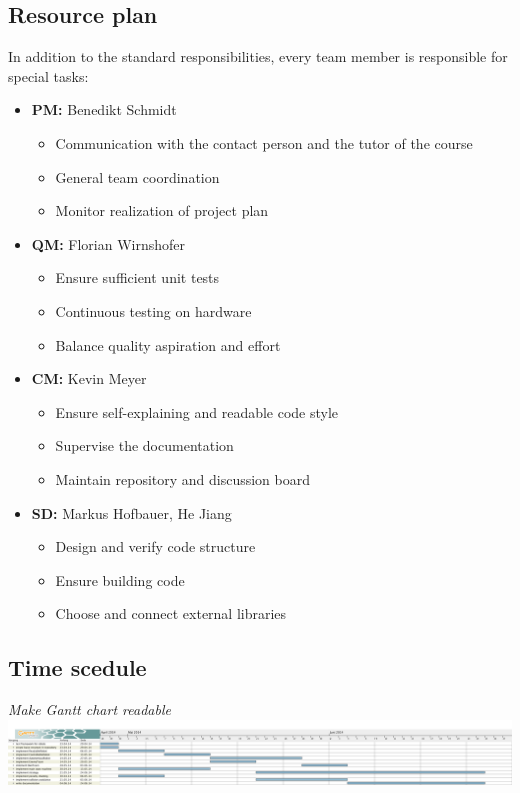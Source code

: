 \documentclass[12pt]{article}
\begin{document}
\subsection{Resource plan}
In addition to the standard responsibilities, every team member is responsible for special tasks:
\begin{itemize}
	\item \textbf{PM:} Benedikt Schmidt
	\begin{itemize}
		\item Communication with the contact person and the tutor of the course
		\item General team coordination
		\item Monitor realization of project plan
	\end{itemize}
	 
	\item \textbf{QM:} Florian Wirnshofer
	\begin{itemize}
		\item Ensure sufficient unit tests
		\item Continuous testing on hardware
		\item Balance quality aspiration and effort
	\end{itemize}
	
	\item \textbf{CM:} Kevin Meyer
	\begin{itemize}
		\item Ensure self-explaining and readable code style
		\item Supervise the documentation
		\item Maintain repository and discussion board
	\end{itemize}
	
	\item \textbf{SD:} Markus Hofbauer, He Jiang 
	\begin{itemize}
		\item Design and verify code structure
		\item Ensure building code
		\item Choose and connect external libraries
	\end{itemize}
	
\end{itemize}

\subsection{Time scedule}
\textit{Make Gantt chart readable}\\
\includegraphics[width=\textwidth]{../ganttchart.png}
\end{document}
